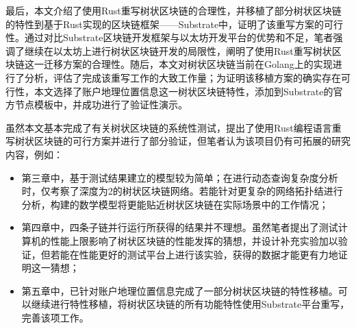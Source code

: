 \begin{conclusion}
  最后，本文介绍了使用Rust重写树状区块链的合理性，并移植了部分树状区块链的特性到基于Rust实现的区块链框架——Substrate中，证明了该重写方案的可行性。通过对比Substrate区块链开发框架与以太坊开发平台的优势和不足，笔者强调了继续在以太坊上进行树状区块链开发的局限性，阐明了使用Rust重写树状区块链这一迁移方案的合理性。随后，本文对树状区块链当前在Golang上的实现进行了分析，评估了完成该重写工作的大致工作量；为证明该移植方案的确实存在可行性，本文选择了账户地理位置信息这一树状区块链特性，添加到Substrate的官方节点模板中，并成功进行了验证性演示。

虽然本文基本完成了有关树状区块链的系统性测试，提出了使用Rust编程语言重写树状区块链的可行方案并进行了部分验证，但笔者认为该项目仍有可拓展的研究内容，例如：

\begin{itemize}
  \item 第三章中，基于测试结果建立的模型较为简单；在进行动态查询复杂度分析时，仅考察了深度为2的树状区块链网络。若能针对更复杂的网络拓扑结进行分析，构建的数学模型将更能贴近树状区块链在实际场景中的工作情况；
  \item 第四章中，四条子链并行运行所获得的结果并不理想。虽然笔者提出了测试计算机的性能上限影响了树状区块链的性能发挥的猜想，并设计补充实验加以验证，但若能在性能更好的测试平台上进行该实验，获得的数据才能更有力地证明这一猜想；
  \item 第五章中，已针对账户地理位置信息完成了一部分树状区块链的特性移植。可以继续进行特性移植，将树状区块链的所有功能特性使用Substrate平台重写，完善该项工作。
\end{itemize}

\end{conclusion}
